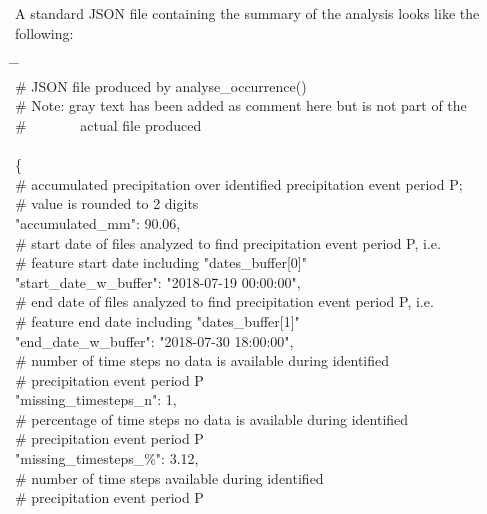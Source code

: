\documentclass[10pt,a4paper,titlepage,parskip]{scrartcl}
\newenvironment{ttfont}{\fontfamily{\ttdefault}\selectfont}{\par}
\newcommand{\GRAU}[1]{\textcolor{ufzgray2}{#1}}
\begin{document}
A standard JSON file containing the summary of the analysis looks like the following:
\begin{framed}
	\vspace*{-1.2cm}
	\begin{ttfont}
		\begin{tabbing}
			\hspace{0.5cm} \= \hspace{0.5cm} \= \kill \\[4pt]
			\GRAU{\# JSON file produced by analyse\_occurrence()}\\
			\GRAU{\# Note: gray text has been added as comment here but is not part of the }\\
			\GRAU{\# \ \ \ \ \ \ \ actual file produced}\\
			\\
			\{ \\
				\> \GRAU{\# accumulated precipitation over identified precipitation event period P;}\\
				\> \GRAU{\# value is rounded to 2 digits}\\
				\> "accumulated\_mm": 90.06,  \\
				\> \GRAU{\# start date of files analyzed to find precipitation event period P, i.e.}\\
				\> \GRAU{\# feature start date including "dates\_buffer[0]"}\\
				\> "start\_date\_w\_buffer": "2018-07-19 00:00:00",  \\
				\> \GRAU{\# end date of files analyzed to find precipitation event period P, i.e.}\\
				\> \GRAU{\# feature end date including "dates\_buffer[1]"}\\
				\> "end\_date\_w\_buffer": "2018-07-30 18:00:00",  \\
				\> \GRAU{\# number of time steps no data is available during identified }\\
				\> \GRAU{\# precipitation event period P}\\
				\> "missing\_timesteps\_n": 1,  \\
				\> \GRAU{\# percentage of time steps no data is available during identified }\\
				\> \GRAU{\# precipitation event period P}\\
				\> "missing\_timesteps\_\%": 3.12,  \\
				\> \GRAU{\# number of time steps available during identified }\\
				\> \GRAU{\# precipitation event period P}\\

\end{tabbing}
\end{ttfont}
\end{framed}
\end{document}
